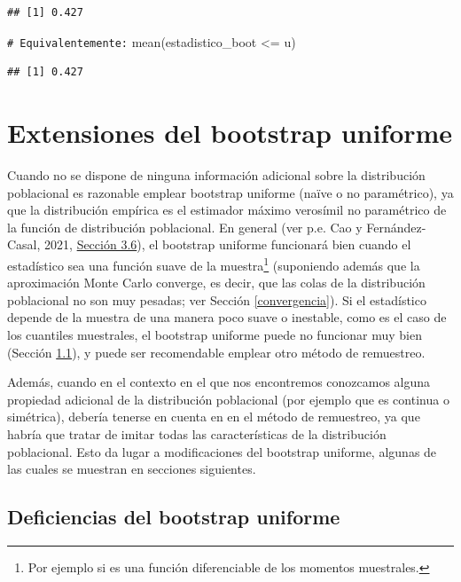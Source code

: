 \documentclass[
]{book}
\newenvironment{Shaded}{\begin{snugshade}}{\end{snugshade}}
\newcommand{\CommentTok}[1]{\textcolor[rgb]{0.56,0.35,0.01}{\textit{#1}}}
\newcommand{\FunctionTok}[1]{\textcolor[rgb]{0.00,0.00,0.00}{#1}}
\newcommand{\NormalTok}[1]{#1}
\newcommand{\SpecialCharTok}[1]{\textcolor[rgb]{0.00,0.00,0.00}{#1}}
\theoremstyle{break}
\theoremstyle{nonumberplain}
\renewcommand{\CommentTok}[1]{\textcolor[rgb]{0.41,0.41,0.41}{\texttt{#1}}}
\begin{document}
\begin{verbatim}
## [1] 0.427
\end{verbatim}

\begin{Shaded}
\begin{Highlighting}[]
\CommentTok{\# Equivalentemente:}
\FunctionTok{mean}\NormalTok{(estadistico\_boot }\SpecialCharTok{\textless{}=}\NormalTok{ u)}
\end{Highlighting}
\end{Shaded}

\begin{verbatim}
## [1] 0.427
\end{verbatim}

\hypertarget{modunif}{%
\chapter{Extensiones del bootstrap uniforme}\label{modunif}}

Cuando no se dispone de ninguna información adicional sobre la distribución poblacional es razonable emplear bootstrap uniforme (naïve o no paramétrico), ya que la distribución empírica es el estimador máximo verosímil no paramétrico de la función de distribución poblacional.
En general (ver p.e. Cao y Fernández-Casal, 2021, \href{https://rubenfcasal.github.io/book_remuestreo/validez-de-la-aproximaci\%C3\%B3n-bootstrap.html}{Sección 3.6}), el bootstrap uniforme funcionará bien cuando el estadístico sea una función suave de la muestra\footnote{Por ejemplo si es una función diferenciable de los momentos muestrales.} (suponiendo además que la aproximación Monte Carlo converge, es decir, que las colas de la distribución poblacional no son muy pesadas; ver Sección \ref{convergencia}).
Si el estadístico depende de la muestra de una manera poco suave o inestable, como es el caso de los cuantiles muestrales, el bootstrap uniforme puede no funcionar muy bien (Sección \ref{deficien-unif}), y puede ser recomendable emplear otro método de remuestreo.

Además, cuando en el contexto en el que nos encontremos conozcamos alguna propiedad adicional de la distribución poblacional (por ejemplo que es continua o simétrica), debería tenerse en cuenta en en el método de remuestreo, ya que habría que tratar de imitar todas las características de la distribución poblacional.
Esto da lugar a modificaciones del bootstrap uniforme, algunas de las cuales se muestran en secciones siguientes.

\hypertarget{deficien-unif}{%
\section{Deficiencias del bootstrap uniforme}\label{deficien-unif}}
\end{document}

